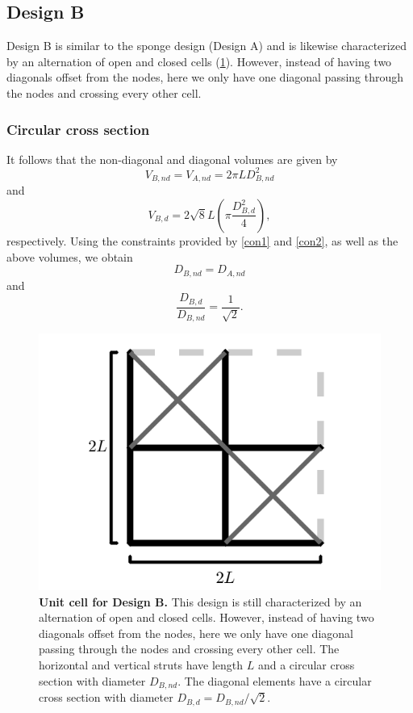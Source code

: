 \documentclass[10pt,twoside]{fernandes_supp}
\begin{document}
\subsection{Design B}
Design B is similar to the sponge design (Design A) and is likewise characterized by an alternation of open and closed cells (\cref{DesignB}). However, instead of having two diagonals offset from the nodes, here we only have one diagonal passing through the nodes and crossing every other cell. 
\subsubsection{Circular cross section}
It follows that the non-diagonal and diagonal volumes are given by
\begin{equation}
V_{B,nd}=V_{A,nd}=2\pi L D_{B,nd}^2
\end{equation}
and
\begin{equation}
V_{B,d}=2\sqrt{8} L \left(\pi \frac{{D}_{B,d}^2}{4}\right),
\end{equation}
respectively.
Using the constraints provided by \cref{con1} and \cref{con2}, as well as the above volumes, we  obtain 
\begin{equation}
{{D}_{B,nd}}={{D}_{A,nd}}
\end{equation}
and
\begin{equation}
\frac{{D}_{B,d}}{{D}_{B,nd}}=\frac{1}{\sqrt{2}}.
\end{equation}

\begin{figure}[H]
    \centering
    \includegraphics[width=0.4\linewidth]{SFig3.png}
    \caption{{\bf Unit cell for Design B.} This design is still characterized by an alternation of open and closed cells. However, instead of having two  diagonals offset from the nodes, here we only have one diagonal passing through the nodes and crossing every other cell. The horizontal and vertical struts have length $L$ and a circular cross section with diameter $D_{B,nd}$. The diagonal elements have a circular cross section  with diameter $D_{B,d}={D_{B,nd}}/{\sqrt{2}}$.}
    \label{DesignB}
\end{figure}
\end{document}
